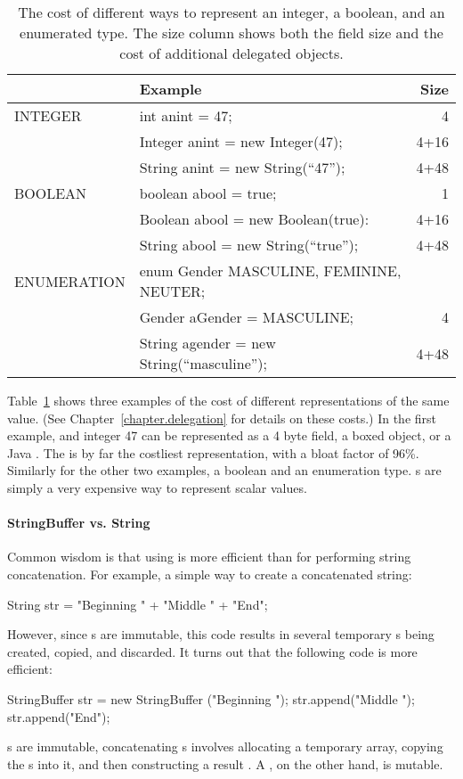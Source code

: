 \begin{table}
  \centering
\begin{tabular}{llr} \toprule \toprule
& Example & Size \\ \midrule \midrule
INTEGER & int anint = 47; & 4 \\
\midrule
& Integer anint = new Integer(47); & 4+16  \\
\midrule
& String anint = new String(``47''); & 4+48 \\
\midrule
\midrule
BOOLEAN & boolean abool = true; & 1\\
\midrule
& Boolean abool = new Boolean(true): & 4+16 \\
\midrule
& String abool = new String(``true''); & 4+48 \\
\midrule \midrule
ENUMERATION & enum Gender {MASCULINE, FEMININE, NEUTER}; &\\
& Gender aGender = MASCULINE; & 4 \\
\midrule
& String agender = new String(``masculine''); & 4+48 \\
\bottomrule \bottomrule
\end{tabular}
\caption{The cost of different ways to represent an integer, a boolean, and an
enumerated type. The size column shows both the field size and the cost of
additional delegated objects.}
\label{tab:data-sizes}
\end{table}

Table~\ref{tab:data-sizes} shows three examples of the cost of different
representations of the same value. (See Chapter~\ref{chapter.delegation} for
details on these costs.) In the first example, and integer 47 can be
represented as a 4 byte field, a boxed object, or a Java . 
The  is by far the costliest representation, with a bloat factor of
96\%.  Similarly for the other two examples, a boolean and an enumeration type.
s are simply a very expensive way to represent scalar values.

\paragraph{StringBuffer vs. String}

Common wisdom is that using  is more efficient than
 for performing string concatenation. For example, a simple way
to create a concatenated string:
\begin{shortlisting}
	String str = "Beginning  " + "Middle " +  "End";
\end{shortlisting}
However, since s are immutable, this code results in several
temporary s being created, copied, and discarded.  It turns out
that the following code is more efficient:
\begin{shortlisting}
	StringBuffer str = new StringBuffer ("Beginning ");
	str.append("Middle ");
    str.append("End");
\end{shortlisting}
s are immutable, concatenating s involves allocating a temporary
 array, copying the s into it, and then constructing
a result . A , on the other hand, is mutable.

